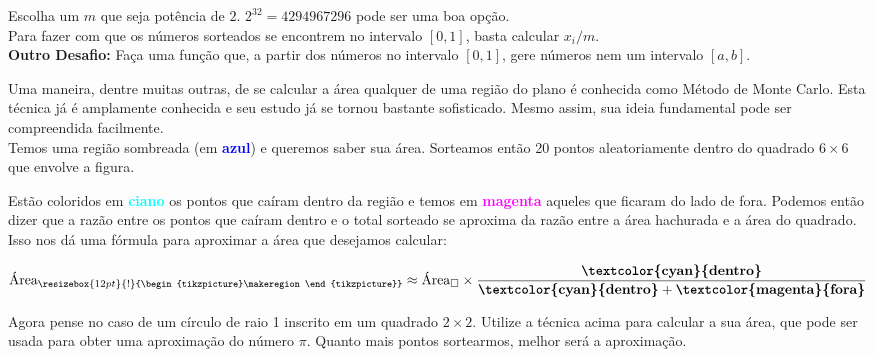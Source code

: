         \clue Escolha um $m$ que seja potência de $2$. $2^{32} = 4294967296$ pode ser uma boa opção. \\
        
        Para fazer com que os números sorteados se encontrem no intervalo $[0, 1]$, basta calcular $x_i / m$. \\
        
        \textbf{Outro Desafio:} Faça uma função que, a partir dos números no intervalo $[0, 1]$, gere números nem um intervalo $[a, b]$.
        
        \hfill
        
        \pagebreak
        
        
        Uma maneira, dentre muitas outras, de se calcular a área qualquer de uma região do plano é conhecida como Método de Monte Carlo. Esta técnica já é amplamente conhecida e seu estudo já se tornou bastante sofisticado. Mesmo assim, sua ideia fundamental pode ser compreendida facilmente.\\
        
        Temos uma região sombreada (em \textbf{\textcolor{blue}{azul}}) e queremos saber sua área. Sorteamos então 20 pontos aleatoriamente dentro do quadrado $6 \times 6$ que envolve a figura.
        
        
        
        Estão coloridos em \textbf{\textcolor{cyan}{ciano}} os pontos que caíram dentro da região e temos em \textbf{\textcolor{magenta}{magenta}} aqueles que ficaram do lado de fora. Podemos então dizer que a razão entre os pontos que caíram dentro e o total sorteado se aproxima da razão entre a área hachurada e a área do quadrado. Isso nos dá uma fórmula para aproximar a área que desejamos calcular:
        
        $$\text{Área}_{\resizebox{12pt}{!}{\begin{tikzpicture}\makeregion\end{tikzpicture}}} \approx \text{Área}_{\square} \times \frac{\text{\textbf{\textcolor{cyan}{dentro}}}}{\text{\textbf{\textcolor{cyan}{dentro}}} + \text{\textbf{\textcolor{magenta}{fora}}}}$$
        
        \quest Agora pense no caso de um círculo de raio 1 inscrito em um quadrado $2 \times 2$. Utilize a técnica acima para calcular a sua área, que pode ser usada para obter uma aproximação do número $\pi$. Quanto mais pontos sortearmos, melhor será a aproximação.\\
        
